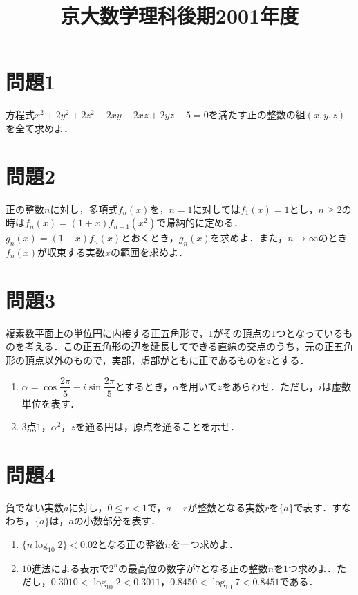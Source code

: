 \documentclass[unicode,12pt, A4j]{ltjsarticle}%
\title{京大数学理科後期2001年度}
\author{}
\date{}
\begin{document}
\maketitle

\section{問題1}
方程式$x^2+2y^2+2z^2-2xy-2xz+2yz-5=0$を満たす正の整数の組$(x,y,z)$を全て求めよ．


\section{問題2}
正の整数$n$に対し，多項式$f_n(x)$を，$n=1$に対しては$f_1(x)=1$とし，$n\ge 2$の時は$f_n(x)=(1+x)f_{n-1}(x^2)$で帰納的に定める．$g_n(x)=(1-x)f_n(x)$とおくとき，$g_n(x)$を求めよ．また，$n\to\infty$のとき$f_n(x)$が収束する実数$x$の範囲を求めよ．


\section{問題3}
複素数平面上の単位円に内接する正五角形で，$1$がその頂点の$1$つとなっているものを考える．この正五角形の辺を延長してできる直線の交点のうち，元の正五角形の頂点以外のもので，実部，虚部がともに正であるものを$z$とする．
\begin{enumerate}
 \item $\alpha=\cos\dfrac{2\pi}{5}+i\sin\dfrac{2\pi}{5}$とするとき，$\alpha$を用いて$z$をあらわせ．ただし，$i$は虚数単位を表す．
 \item $3$点$1$，$\alpha^2$，$z$を通る円は，原点を通ることを示せ．
\end{enumerate}


\section{問題4}
負でない実数$a$に対し，$0\le r<1$で，$a-r$が整数となる実数$r$を$\{a\}$で表す．すなわち，$\{a\}$は，$a$の小数部分を表す．
\begin{enumerate}
 \item $\{n\log_{10} 2\}<0.02$となる正の整数$n$を一つ求めよ．
 \item $10$進法による表示で$2^n$の最高位の数字が$7$となる正の整数$n$を$1$つ求めよ．ただし，$0.3010<\log_{10}2<0.3011$，$0.8450<\log_{10}7<0.8451$である．
\end{enumerate}
\end{document}
